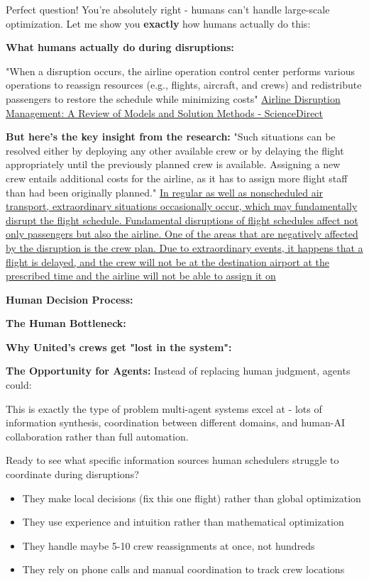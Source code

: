 \begin{botresponse}
Perfect question! You're absolutely right - humans can't handle large-scale optimization. Let me show you \textbf{exactly} how humans actually do this:

\textbf{What humans actually do during disruptions:}

"When a disruption occurs, the airline operation control center performs various operations to reassign resources (e.g., flights, aircraft, and crews) and redistribute passengers to restore the schedule while minimizing costs" \href{https://www.sciencedirect.com/science/article/pii/S2095809921000175}{Airline Disruption Management: A Review of Models and Solution Methods - ScienceDirect}

\textbf{But here's the key insight from the research:} "Such situations can be resolved either by deploying any other available crew or by delaying the flight appropriately until the previously planned crew is available. Assigning a new crew entails additional costs for the airline, as it has to assign more flight staff than had been originally planned." \href{https://www.hindawi.com/journals/mpe/2020/5372567/}{In regular as well as nonscheduled air transport, extraordinary situations occasionally occur, which may fundamentally disrupt the flight schedule. Fundamental disruptions of flight schedules affect not only passengers but also the airline. One of the areas that are negatively affected by the disruption is the crew plan. Due to extraordinary events, it happens that a flight is delayed, and the crew will not be at the destination airport at the prescribed time and the airline will not be able to assign it on}

\textbf{Human Decision Process:}

\textbf{The Human Bottleneck:}

\textbf{Why United's crews get "lost in the system":}

\textbf{The Opportunity for Agents:} Instead of replacing human judgment, agents could:

This is exactly the type of problem multi-agent systems excel at - lots of information synthesis, coordination between different domains, and human-AI collaboration rather than full automation.

Ready to see what specific information sources human schedulers struggle to coordinate during disruptions?

\begin{itemize}
\item They make local decisions (fix this one flight) rather than global optimization
\item They use experience and intuition rather than mathematical optimization
\item They handle maybe 5-10 crew reassignments at once, not hundreds
\item They rely on phone calls and manual coordination to track crew locations
\end{itemize}


\end{botresponse}
